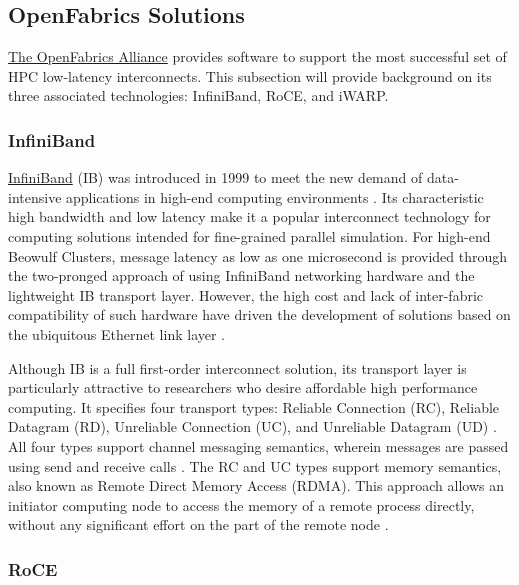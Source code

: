 \documentclass[11pt]{book}
\begin{document}
\subsection{\textbf{OpenFabrics Solutions}}

\href{www.openfabrics.org}{The OpenFabrics Alliance} provides software to
support the most successful set of HPC low-latency interconnects. This
subsection will provide background on its three associated technologies:
InfiniBand, RoCE, and iWARP.

\subsubsection{\textbf{InfiniBand}}

\href {www.infinibandta.org}{InfiniBand} (IB) was introduced in
1999 to meet the new demand of data-intensive applications in high-end computing
environments \cite{InfiniBandTABase-07}. Its characteristic high bandwidth and
low latency make it a popular interconnect technology for computing solutions
intended for fine-grained parallel simulation. For high-end Beowulf Clusters,
message latency as low as one microsecond is provided through the two-pronged
approach of using InfiniBand networking hardware and the lightweight IB
transport layer. However, the high cost and lack of inter-fabric compatibility
of such hardware have driven the development of solutions based on the
ubiquitous Ethernet link layer \cite{roce-announce}.

Although IB is a full first-order interconnect solution, its transport layer is
particularly attractive to researchers who desire affordable high performance
computing. It specifies four transport types: Reliable Connection (RC), Reliable
Datagram (RD), Unreliable Connection (UC), and Unreliable Datagram (UD)
\cite{InfiniBandTABase-07}. All four types support channel messaging semantics,
wherein messages are passed using send and receive calls
\cite{InfiniBandTABase-07}. The RC and UC types support memory semantics, also
known as Remote Direct Memory Access (RDMA). This approach allows an initiator
computing node to access the memory of a remote process directly, without any
significant effort on the part of the remote node \cite{sur-11}.

\subsubsection{\textbf{RoCE}}
\end{document}
